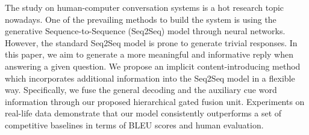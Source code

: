 The study on human-computer conversation systems is a hot research topic nowadays. One of the prevailing methods to build the system is using the generative Sequence-to-Sequence (Seq2Seq) model through neural networks. However, the standard Seq2Seq model is prone to generate trivial responses. In this paper, we aim to generate a more meaningful and informative reply when answering a given question. We propose an implicit content-introducing method which incorporates additional information into the Seq2Seq model in a flexible way. Specifically, we fuse the general decoding and the auxiliary cue word information through our proposed hierarchical gated fusion unit. Experiments on real-life data demonstrate that our model consistently outperforms a set of competitive baselines in terms of BLEU scores and human evaluation.

